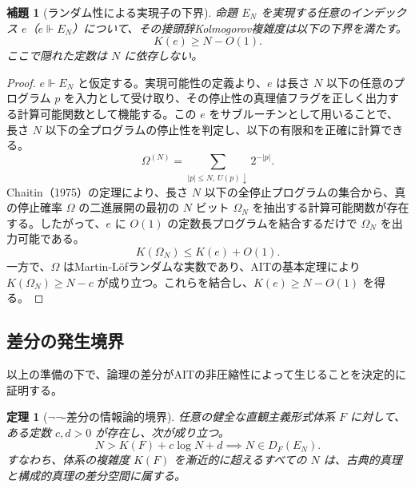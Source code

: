 \documentclass[a4paper,11pt]{ltjsarticle}
\theoremstyle{plain}
\newtheorem{lemma}{補題}
\newtheorem{theorem}{定理}
\begin{document}
\begin{lemma}[ランダム性による実現子の下界]
命題 $E_N$ を実現する任意のインデックス $e$（$e \Vdash E_N$）について、その接頭辞Kolmogorov複雑度は以下の下界を満たす。
\[
K(e) \ge N - O(1).
\]
ここで隠れた定数は $N$ に依存しない。
\end{lemma}

\begin{proof}
$e \Vdash E_N$ と仮定する。実現可能性の定義より、$e$ は長さ $N$ 以下の任意のプログラム $p$ を入力として受け取り、その停止性の真理値フラグを正しく出力する計算可能関数として機能する。この $e$ をサブルーチンとして用いることで、長さ $N$ 以下の全プログラムの停止性を判定し、以下の有限和を正確に計算できる。
\[
\Omega^{(N)} = \sum_{\lvert p\rvert \le N,\, U(p)\downarrow} 2^{-\lvert p\rvert}.
\]
Chaitin（1975）の定理により、長さ $N$ 以下の全停止プログラムの集合から、真の停止確率 $\Omega$ の二進展開の最初の $N$ ビット $\Omega_N$ を抽出する計算可能関数が存在する。したがって、$e$ に $O(1)$ の定数長プログラムを結合するだけで $\Omega_N$ を出力可能である。
\[
K(\Omega_N) \le K(e) + O(1).
\]
一方で、$\Omega$ はMartin-Löfランダムな実数であり、AITの基本定理により $K(\Omega_N) \ge N - c$ が成り立つ。これらを結合し、$K(e) \ge N - O(1)$ を得る。
\end{proof}

\subsection{差分の発生境界}

以上の準備の下で、論理の差分がAITの非圧縮性によって生じることを決定的に証明する。

\begin{theorem}[$\neg\neg$-差分の情報論的境界]
任意の健全な直観主義形式体系 $F$ に対して、ある定数 $c, d > 0$ が存在し、次が成り立つ。
\[
N > K(F) + c \log N + d \implies N \in D_F(E_N).
\]
すなわち、体系の複雑度 $K(F)$ を漸近的に超えるすべての $N$ は、古典的真理と構成的真理の差分空間に属する。
\end{theorem}
\end{document}
